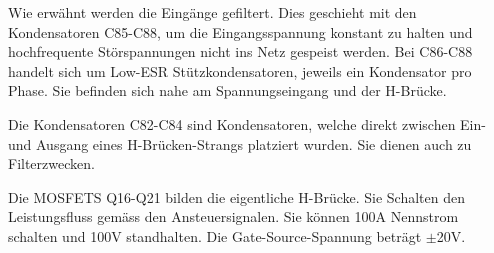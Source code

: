 Wie erwähnt werden die Eingänge gefiltert. Dies geschieht mit den Kondensatoren C85-C88, um die Eingangsspannung konstant zu halten und hochfrequente Störspannungen nicht ins Netz gespeist werden.
Bei C86-C88 handelt sich um Low-ESR Stützkondensatoren, jeweils ein Kondensator pro Phase.
Sie befinden sich nahe am Spannungseingang und der H-Brücke.

Die Kondensatoren C82-C84 sind Kondensatoren, welche direkt zwischen Ein- und Ausgang eines H-Brücken-Strangs platziert wurden.
Sie dienen auch zu Filterzwecken.

Die MOSFETS Q16-Q21 bilden die eigentliche H-Brücke. Sie Schalten den Leistungsfluss gemäss den Ansteuersignalen. Sie können 100A Nennstrom schalten und 100V standhalten. Die Gate-Source-Spannung beträgt $\pm$20V.